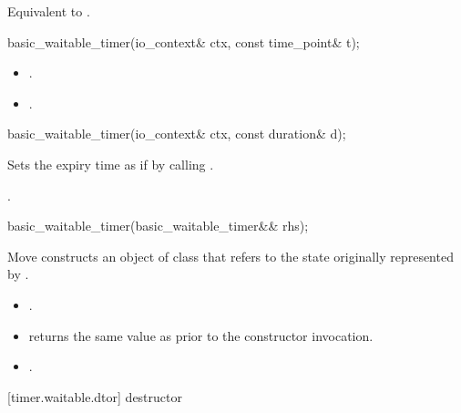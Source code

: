 \begin{itemdescr}
\pnum
\effects Equivalent to .
\end{itemdescr}

\begin{itemdecl}
basic_waitable_timer(io_context& ctx, const time_point& t);
\end{itemdecl}

\begin{itemdescr}
\pnum
\postconditions
\begin{itemize}
\item
{}.
\item
{}.
\end{itemize}
\end{itemdescr}

\begin{itemdecl}
basic_waitable_timer(io_context& ctx, const duration& d);
\end{itemdecl}

\begin{itemdescr}
\pnum
\effects Sets the expiry time as if by calling .

\pnum
\postconditions {}.
\end{itemdescr}

\begin{itemdecl}
basic_waitable_timer(basic_waitable_timer&& rhs);
\end{itemdecl}

\begin{itemdescr}
\pnum
\effects Move constructs an object of class  that refers to the state originally represented by .

\pnum
\postconditions
\begin{itemize}
\item
{}.
\item
{} returns the same value as  prior to the constructor invocation.
\item
{}.
\end{itemize}
\end{itemdescr}



[timer.waitable.dtor]{ destructor}

